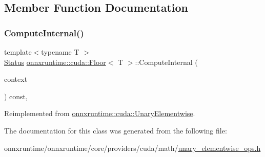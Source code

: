 \subsection{Member Function Documentation}
\mbox{\label{classonnxruntime_1_1cuda_1_1Floor_ad9062f3bb265d435c16206fa28ba4f4f}} 
\subsubsection{\texorpdfstring{Compute\+Internal()}{ComputeInternal()}}
{\footnotesize\ttfamily template$<$typename T $>$ \\
\mbox{\hyperlink{classonnxruntime_1_1common_1_1Status}{Status}} \mbox{\hyperlink{classonnxruntime_1_1cuda_1_1Floor}{onnxruntime\+::cuda\+::\+Floor}}$<$ T $>$\+::Compute\+Internal (\begin{DoxyParamCaption}\item[{\mbox{\hyperlink{classonnxruntime_1_1OpKernelContext}{Op\+Kernel\+Context}} $\ast$}]{context }\end{DoxyParamCaption}) const\hspace{0.3cm}{\ttfamily [override]}, {\ttfamily [virtual]}}



Reimplemented from \mbox{\hyperlink{classonnxruntime_1_1cuda_1_1UnaryElementwise_abbbcb29c3937e2ac9e2ad768d9c69fca}{onnxruntime\+::cuda\+::\+Unary\+Elementwise}}.



The documentation for this class was generated from the following file\+:\begin{DoxyCompactItemize}
\item 
onnxruntime/onnxruntime/core/providers/cuda/math/\mbox{\hyperlink{unary__elementwise__ops_8h}{unary\+\_\+elementwise\+\_\+ops.\+h}}\end{DoxyCompactItemize}
